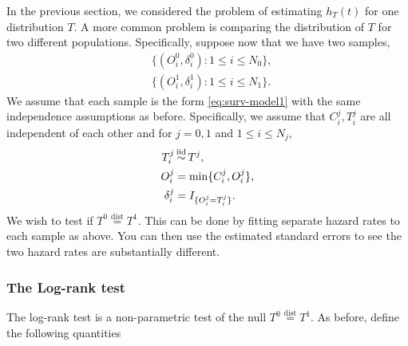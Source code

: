In the previous section, we considered the problem of estimating $h_T(t)$ for one distribution $T$. A more common problem is comparing the distribution of $T$ for two different populations. Specifically, suppose now that we have two samples,
\begin{align*}
    &\{(O_i^0,\delta_i^0):1 \le i \le N_0\},\\
    &\{(O_i^1,\delta_i^1) : 1 \le i \le N_1\}.
\end{align*}
We assume that each sample is the form \eqref{eq:surv-model1} with the same independence assumptions as before. Specifically, we assume that $C_i^j,T_i^j$ are all independent of each other and for $j=0,1$ and $1 \le i \le N_j$,
\begin{align*}
    T_i^j& \simiid T^j,\\
    O_i^j &= \min\{C_i^j,O_i^j\},\\
    \delta_i^j &= I_{\{O_i^j = T_i^j\}}.
\end{align*}
We wish to test if $T^0 \stackrel{\text{dist}}{=} T^1$. This can be done by fitting separate hazard rates to each sample as above. You can then use the estimated standard errors to see the two hazard rates are substantially different. 

\subsubsection*{The Log-rank test}

The log-rank test is a non-parametric test of the null $T^0 \stackrel{\text{dist}}{=}  T^1$. As before, define the following quantities 

